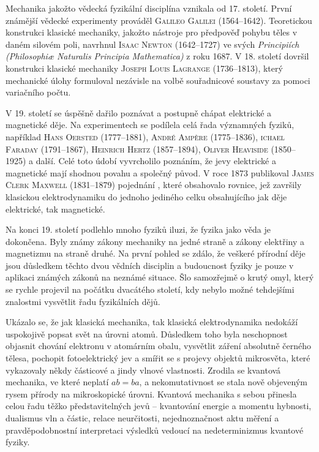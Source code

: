     Mechanika jakožto vědecká fyzikální disciplína vznikala od 17. století. První známější vědecké
    experimenty prováděl \textsc{Galileo Galilei} (1564–1642). Teoretickou konstrukci klasické
    mechaniky, jakožto nástroje pro předpověď pohybu těles v daném silovém poli, navrhnul
    \textsc{Isaac Newton} (1642–1727) ve svých \emph{Principiích (Philosophiæ Naturalis Principia
    Mathematica)} z roku 1687. V 18. století dovršil konstrukci klasické mechaniky \textsc{Joseph
    Louis Lagrange} (1736–1813), který mechanické úlohy formuloval nezávisle na volbě souřadnicové
    soustavy za pomoci variačního počtu.
    
    V 19. století se úspěšně dařilo poznávat a postupně chápat elektrické a magnetické děje. Na
    experimentech se podílela celá řada významných fyziků, například \textsc{Hans Oersted}
    (1777–1881), \textsc{André Ampère} (1775–1836), \textsc{ichael Faraday} (1791–1867),
    \textsc{Heinrich Hertz} (1857–1894), \textsc{Oliver Heaviside} (1850–1925) a další. Celé toto
    údobí vyvrcholilo poznáním, že jevy elektrické a magnetické mají shodnou povahu a společný
    původ. V roce 1873 publikoval \textsc{James Clerk Maxwell} (1831–1879) pojednání , které obsahovalo rovnice, jež završily klasickou elektrodynamiku
    do jednoho jediného celku obsahujícího jak děje elektrické, tak magnetické. 
    
    Na konci 19. století podlehlo mnoho fyziků iluzi, že fyzika jako věda je dokončena. Byly známy
    zákony mechaniky na jedné straně a zákony elektřiny a magnetizmu na straně druhé. Na první
    pohled se zdálo, že veškeré přírodní děje jsou důsledkem těchto dvou vědních disciplin a
    budoucnost fyziky je pouze v aplikaci známých zákonů na neznámé situace. Šlo samozřejmě o krutý
    omyl, který se rychle projevil na počátku dvacátého století, kdy nebylo možné tehdejšími
    znalostmi vysvětlit řadu fyzikálních dějů. 

    Ukázalo se, že jak klasická mechanika, tak klasická elektrodynamika nedokáží uspokojivě popsat
    svět na úrovni atomů. Důsledkem toho byla neschopnost objasnit chování elektronu v atomárním
    obalu, vysvětlit záření absolutně černého tělesa, pochopit fotoelektrický jev a smířit se s
    projevy objektů mikrosvěta, které vykazovaly někdy částicové a jindy vlnové vlastnosti. Zrodila
    se kvantová mechanika, ve které neplatí \(ab = ba\), a nekomutativnost se stala nově objeveným
    rysem přírody na mikroskopické úrovni. Kvantová mechanika s sebou přinesla celou řadu těžko
    představitelných jevů – kvantování energie a momentu hybnosti, dualismus vln a částic, relace
    neurčitosti, nejednoznačnost aktu měření a pravděpodobnostní interpretaci výsledků vedoucí na
    nedeterminizmus kvantové fyziky.

